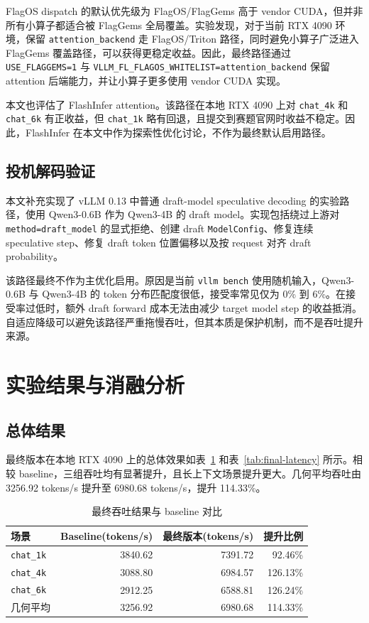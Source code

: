 \documentclass[UTF8,10.5pt]{ctexart}
\newcommand{\code}[1]{\texttt{#1}}
\begin{document}
FlagOS dispatch 的默认优先级为 FlagOS/FlagGems 高于 vendor CUDA，但并非所有小算子都适合被 FlagGems 全局覆盖。实验发现，对于当前 RTX 4090 环境，保留 \code{attention\_backend} 走 FlagOS/Triton 路径，同时避免小算子广泛进入 FlagGems 覆盖路径，可以获得更稳定收益。因此，最终路径通过 \code{USE\_FLAGGEMS=1} 与 \code{VLLM\_FL\_FLAGOS\_WHITELIST=attention\_backend} 保留 attention 后端能力，并让小算子更多使用 vendor CUDA 实现。

本文也评估了 FlashInfer attention。该路径在本地 RTX 4090 上对 \code{chat\_4k} 和 \code{chat\_6k} 有正收益，但 \code{chat\_1k} 略有回退，且提交到赛题官网时收益不稳定。因此，FlashInfer 在本文中作为探索性优化讨论，不作为最终默认启用路径。

\subsection{投机解码验证}

本文补充实现了 vLLM 0.13 中普通 draft-model speculative decoding 的实验路径，使用 Qwen3-0.6B 作为 Qwen3-4B 的 draft model。实现包括绕过上游对 \code{method=draft\_model} 的显式拒绝、创建 draft \code{ModelConfig}、修复连续 speculative step、修复 draft token 位置偏移以及按 request 对齐 draft probability。

该路径最终不作为主优化启用。原因是当前 \code{vllm bench} 使用随机输入，Qwen3-0.6B 与 Qwen3-4B 的 token 分布匹配度很低，接受率常见仅为 0\% 到 6\%。在接受率过低时，额外 draft forward 成本无法由减少 target model step 的收益抵消。自适应降级可以避免该路径严重拖慢吞吐，但其本质是保护机制，而不是吞吐提升来源。

\section{实验结果与消融分析}

\subsection{总体结果}

最终版本在本地 RTX 4090 上的总体效果如表~\ref{tab:final-throughput} 和表~\ref{tab:final-latency} 所示。相较 baseline，三组吞吐均有显著提升，且长上下文场景提升更大。几何平均吞吐由 3256.92 tokens/s 提升至 6980.68 tokens/s，提升 114.33\%。

\begin{table}[H]
\centering
\caption{最终吞吐结果与 baseline 对比}
\label{tab:final-throughput}
\begin{tabular}{lrrr}
\toprule
场景 & Baseline(tokens/s) & 最终版本(tokens/s) & 提升比例 \\
\midrule
\code{chat\_1k} & 3840.62 & 7391.72 & 92.46\% \\
\code{chat\_4k} & 3088.80 & 6984.57 & 126.13\% \\
\code{chat\_6k} & 2912.25 & 6588.81 & 126.24\% \\
几何平均 & 3256.92 & 6980.68 & 114.33\% \\
\bottomrule
\end{tabular}
\end{table}
\end{document}

